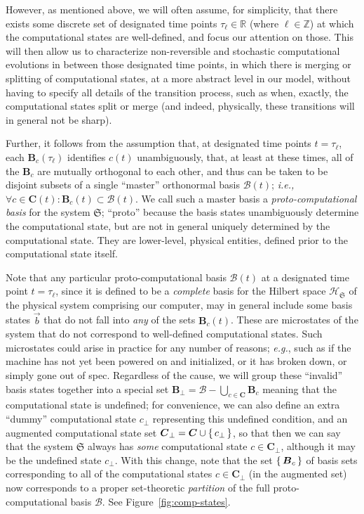 \documentclass[preprints,article,accept,moreauthors,pdftex]{Definitions/mdpi}
\begin{document}
However, as mentioned above, we will often assume, for simplicity, that there exists some discrete set of designated time points $\tau_\ell \in \mathbb{R}$ (where $\ell\in\mathbb{Z}$) at which the computational states are well-defined, and focus our attention on those. This will then allow us to characterize non-reversible and stochastic computational evolutions in between those designated time points, in which there is merging or splitting of computational states, at a more abstract level in our model, without having to specify all details of the transition process, such as when, exactly, the computational states split or merge (and indeed, physically, these transitions will in general not be sharp). 

Further, it follows from the assumption that, at designated time points $t=\tau_\ell$, each $\boldsymbol{B}_c(\tau_\ell)$ identifies $c(t)$ unambiguously, that, at least at these times, all of the $\boldsymbol{B}_c$ are mutually orthogonal to each other, and thus can be taken to be disjoint subsets of a single ``master'' orthonormal basis $\boldsymbol{\mathcal{B}}(t)$; \emph{i.e.,} $\forall c \in \boldsymbol{C}(t):\boldsymbol{B}_c(t) \subset \boldsymbol{\mathcal{B}}(t)$. We call such a master basis a {\em proto-computational basis} for the system $\mathfrak{S}$; ``proto'' because the basis states unambiguously determine the computational state, but are not in general uniquely determined by the computational state. They are lower-level, physical entities, defined prior to the computational state itself.

Note that any particular proto-computational basis $\boldsymbol{\mathcal{B}}(t)$ at a designated time point $t=\tau_\ell$, since it is defined to be a {\em complete} basis for the Hilbert space $\mathcal{H}_\mathfrak{S}$ of the physical system comprising our computer, may in general include some basis states $\vec{b}$ that do not fall into {\em any} of the sets $\boldsymbol{B}_c(t)$. These are microstates of the system that do not correspond to well-defined computational states. Such microstates could arise in practice for any number of reasons; \emph{e.g.}, such as if the machine has not yet been powered on and initialized, or it has broken down, or simply gone out of spec. Regardless of the cause, we will group these ``invalid'' basis states together into a special set $\boldsymbol{B}_\bot = \boldsymbol{\mathcal{B}} - \bigcup_{c\in \boldsymbol{C}} \boldsymbol{B}_c$ meaning that the computational state is undefined; for convenience, we can also define an extra ``dummy'' computational state $c_\bot$ representing this undefined condition, and an augmented computational state set $\boldsymbol{C}_\bot = \boldsymbol{C} \cup \set{c_\bot}$, so that then we can say that the system $\mathfrak{S}$ always has \emph{some} computational state $c \in \boldsymbol{C}_\bot$, although it may be the undefined state $c_\bot$. With this change, note that the set $\set{\boldsymbol{B}_c}$ of basis sets corresponding to all of the computational states $c\in \boldsymbol{C}_\bot$ (in the augmented set) now corresponds to a proper set-theoretic \emph{partition} of the full proto-computational basis $\boldsymbol{\mathcal{B}}$. See Figure~\ref{fig:comp-states}.
\end{document}
